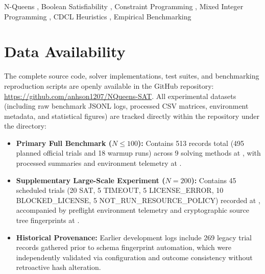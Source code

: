 \documentclass[a4paper,fleqn]{cas-sc}
\begin{document}
\begin{keywords}
N-Queens \sep 
Boolean Satisfiability \sep 
Constraint Programming \sep 
Mixed Integer Programming \sep 
CDCL Heuristics \sep
Empirical Benchmarking
\end{keywords}

\maketitle









\FloatBarrier


\FloatBarrier


\FloatBarrier
\section*{Data Availability}
The complete source code, solver implementations, test suites, and benchmarking reproduction scripts are openly available in the GitHub repository: \url{https://github.com/anhson1207/NQueens-SAT}. All experimental datasets (including raw benchmark JSONL logs, processed CSV matrices, environment metadata, and statistical figures) are tracked directly within the repository under the  directory:
\begin{itemize}
    \item \textbf{Primary Full Benchmark ($N \le 100$):} Contains 513 records total (495 planned official trials and 18 warmup runs) across 9 solving methods at , with processed summaries and environment telemetry at .
    \item \textbf{Supplementary Large-Scale Experiment ($N=200$):} Contains 45 scheduled trials (20 SAT, 5 TIMEOUT, 5 LICENSE\_ERROR, 10 BLOCKED\_LICENSE, 5 NOT\_RUN\_RESOURCE\_POLICY) recorded at , accompanied by preflight environment telemetry and cryptographic source tree fingerprints at .
    \item \textbf{Historical Provenance:} Earlier development logs include 269 legacy trial records gathered prior to schema fingerprint automation, which were independently validated via configuration and outcome consistency without retroactive hash alteration.
\end{itemize}



\end{document}
